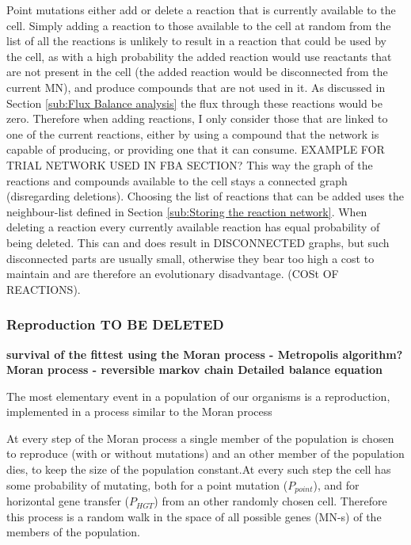 \documentclass[10pt,a4paper]{article}
\begin{document}
	Point mutations either add or delete a reaction that is currently available to the cell. Simply adding a reaction to those available to the cell at random from the list of all the reactions is unlikely to result in a reaction that could be used by the cell, as with a high probability the added reaction would use reactants that are not present in the cell (the added reaction would be disconnected from the current MN), and produce compounds that are not used in it. As discussed in Section \ref{sub:Flux Balance analysis} the flux through these reactions would be zero. Therefore when adding reactions, I only consider those that are linked  to one of the current reactions, either by using a compound that  the network is capable of producing, or providing one that it can consume. EXAMPLE FOR TRIAL NETWORK USED IN FBA SECTION? This way the graph of the reactions and compounds available to the cell stays a connected graph (disregarding deletions). Choosing the list of reactions that can be added uses the neighbour-list defined in Section \ref{sub:Storing the reaction network}. When deleting a reaction every currently available reaction has equal probability of being deleted. This can and does result in DISCONNECTED graphs, but such disconnected parts are usually small, otherwise they bear too high a cost to maintain and are therefore an evolutionary disadvantage. (COSt OF REACTIONS).  
	
	\subsubsection{Reproduction TO BE DELETED}
\label{ssub:Reproduction}
\textbf{survival of the fittest using the Moran process - Metropolis algorithm?
Moran process - reversible markov chain
Detailed balance equation}


The most elementary event in a population of our organisms is a reproduction, implemented in a process similar to the Moran process \cite{moranprocess} 

At every step of the Moran process a single member of the population is chosen to reproduce (with or without mutations) and an other member of the population dies, to keep the size of the population constant.At every such step the cell has some probability of mutating, both for a point mutation ($P_{point}$), and for horizontal gene transfer ($P_{HGT}$) from an other randomly chosen cell.  Therefore this process is a random walk in the space of all possible genes (MN-s) of the members of the population. 
\end{document}
